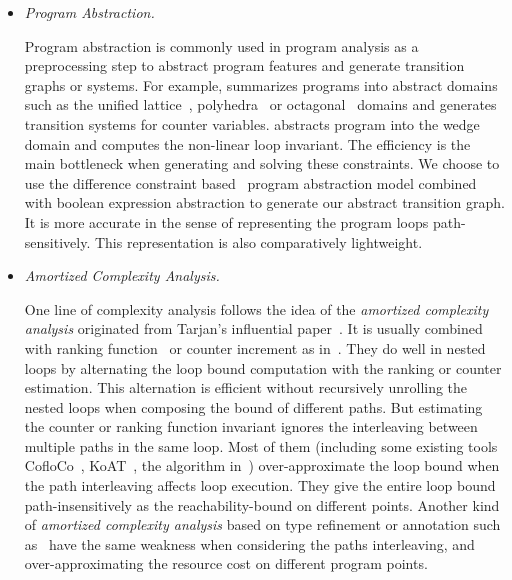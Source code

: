 \begin{itemize}
\item \emph{Program Abstraction.}

Program abstraction is commonly used in program analysis as a preprocessing step to abstract program features and generate transition graphs or systems. For example, \cite{GulwaniZ10} summarizes programs into abstract domains such as the unified lattice~\cite{CousotH78}, polyhedra~\cite{CousotC77} or octagonal~\cite{Mine06} domains and generates transition systems for counter variables.
\cite{KincaidCBR18} abstracts program into the wedge domain and computes the non-linear loop invariant.
The efficiency is the main bottleneck when generating and solving these constraints.
We choose to use the difference constraint based~\cite{SinnZV17,SinnZV14} program abstraction model combined with boolean expression abstraction to generate our abstract transition graph.
It is more accurate in the sense of representing the program loops path-sensitively. This representation is also comparatively lightweight.

\item \emph{Amortized Complexity Analysis.}

One line of complexity analysis follows the idea of the \emph{amortized complexity analysis} originated from Tarjan's influential paper~\cite{PotechinP17}. It is usually combined with ranking function~\cite{BradleyMS05,CookSZ13,Zuleger18} or counter increment as in~\cite{ZulegerGSV11,SinnZV14,SinnZV17,LuCT21,AliasDFG10}.
They do well in nested loops by alternating the loop bound computation with the ranking or counter estimation. This alternation is efficient without recursively unrolling the nested loops when composing the bound of different paths.
  But estimating the counter or ranking function invariant ignores the interleaving between multiple paths in the same loop.
Most of them (including some existing tools CofloCo~\cite{Montoya17,Flores-MontoyaH14,Flores-Montoya16}, KoAT~\cite{BrockschmidtEFFG16,BrockschmidtEFFG14,FalkeKS12,FalkeKS11}, the algorithm in~\cite{LuCT21}) over-approximate the loop bound when the path interleaving affects loop execution. They give the entire loop bound path-insensitively as the reachability-bound on different points. Another kind of \emph{amortized complexity analysis} based on type refinement or annotation such as~\cite{CraryW00,JostHLH10,CicekBG0H17,RajaniG0021,CarbonneauxHS15} have the same weakness when considering the paths interleaving, and over-approximating the resource cost on different program points.


\end{itemize}
